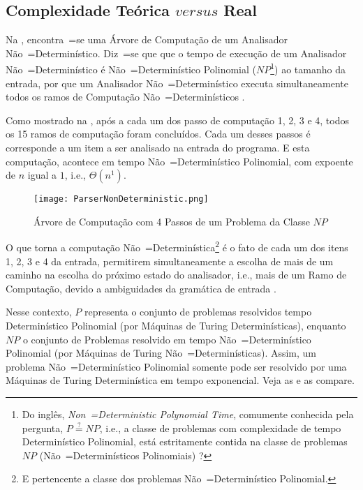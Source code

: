\subsection{Complexidade Teórica $versus$ Real}

Na ,
encontra~=se uma Árvore de Computação de um Analisador Não~=Determinístico.
Diz~=se que que o tempo de execução de um Analisador Não~=Determinístico é Não~=Determinístico Polinomial ($NP$\footnote{
Do inglês, \textit{Non~=Deterministic Polynomial Time},
comumente conhecida pela pergunta,
$P \stackrel{?}{=} NP$, i.e.,
a classe de problemas com complexidade de tempo Determinístico Polinomial,
está estritamente contida na classe de problemas $NP$ (Não~=Determinísticos Polinomiais) \cite{computationalComplexityAuroraBarak}?
})
ao tamanho da entrada,
por que um Analisador Não~=Determinístico executa simultaneamente todos os ramos de Computação Não~=Determinísticos \cite{hopcroftBook}.

Como mostrado na ,
após a cada um dos passo de computação 1,
2, 3 e 4,
todos os 15 ramos de computação foram concluídos.
Cada um desses passos é corresponde a um item a ser analisado na entrada do programa.
E esta computação,
acontece em tempo Não~=Determinístico Polinomial,
com expoente de $n$ igual a $1$,
i.e.,
$\Theta(n^1)$.
\begin{figure}[!htb]
\caption{Árvore de Computação com 4 Passos\protect\footnotemark{} de um Problema da Classe $NP$}
\label{ParserNonDeterministic}
\centering
\texttt{[image: ParserNonDeterministic.png]}
\end{figure}

O que torna a computação Não~=Determinística\footnote{
E pertencente a classe dos problemas Não~=Determinístico Polinomial.
} é o fato de cada um dos itens 1,
2, 3 e 4 da entrada,
permitirem simultaneamente a escolha de mais de um caminho na escolha do próximo estado do analisador,
i.e.,
mais de um Ramo de Computação,
devido a ambiguidades da gramática de entrada \cite{antlrBookTerrentParr}.

Nesse contexto,
$P$ representa o conjunto de problemas resolvidos tempo Determinístico Polinomial (por Máquinas de Turing Determinísticas),
enquanto $NP$ o conjunto de Problemas resolvido em tempo Não~=Determinístico Polinomial (por Máquinas de Turing Não~=Determinísticas).
Assim,
um problema Não~=Determinístico Polinomial somente pode ser resolvido por uma Máquinas de Turing Determinística em tempo exponencial.
Veja as  e
as compare.

